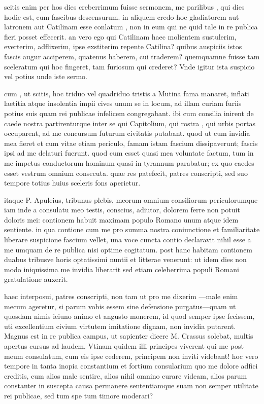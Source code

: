  scitis enim per hos dies creberrimum fuisse sermonem, me parilibus , qui dies hodie est, cum fascibus descensurum. in aliquem credo hoc gladiatorem aut latronem aut Catilinam esse conlatum , non in eum qui ne quid tale in re publica fieri posset effecerit. an vero ego qui Catilinam haec molientem sustulerim, everterim, adflixerim, ipse exstiterim repente Catilina? quibus auspiciis istos fascis augur acciperem, quatenus haberem, cui traderem? quemquamne fuisse tam sceleratum qui hoc fingeret, tam furiosum qui crederet? Vnde igitur ista suspicio vel potius unde iste sermo.

 cum , ut scitis, hoc triduo vel quadriduo tristis a Mutina fama manaret, inflati laetitia atque insolentia impii cives unum se in locum, ad illam curiam furiis potius suis quam rei publicae infelicem congregabant. ibi cum consilia inirent de caede nostra partirenturque inter se qui Capitolium, qui rostra , qui urbis portas occuparent, ad me concursum futurum civitatis putabant. quod ut cum invidia mea fieret et cum vitae etiam periculo, famam istam fascium dissipaverunt; fascis ipsi ad me delaturi fuerunt. quod cum esset quasi mea voluntate factum, tum in me impetus conductorum hominum quasi in tyrannum parabatur; ex quo caedes esset vestrum omnium consecuta. quae res patefecit, patres conscripti, sed suo tempore totius huius sceleris fons aperietur.

 itaque P. Apuleius, tribunus plebis, meorum omnium consiliorum periculorumque iam inde a consulatu meo testis, conscius, adiutor, dolorem ferre non potuit doloris mei: contionem habuit maximam populo Romano unum atque idem sentiente. in qua contione cum me pro summa nostra coniunctione et familiaritate liberare suspicione fascium vellet, una voce cuncta contio declaravit nihil esse a me umquam de re publica nisi optime cogitatum. post hanc habitam contionem duabus tribusve horis optatissimi nuntii et litterae venerunt: ut idem dies non modo iniquissima me invidia liberarit sed etiam celeberrima populi Romani gratulatione auxerit.

 haec interposui, patres conscripti, non tam ut pro me dixerim —male enim mecum ageretur, si parum vobis essem sine defensione purgatus—quam ut quosdam nimis ieiuno animo et angusto monerem, id quod semper ipse fecissem, uti excellentium civium virtutem imitatione dignam, non invidia putarent. Magnus est in re publica campus, ut sapienter dicere M. Crassus solebat, multis apertus cursus ad laudem. Vtinam quidem illi principes viverent qui me post meum consulatum, cum eis ipse cederem, principem non inviti videbant! hoc vero tempore in tanta inopia constantium et fortium consularium quo me dolore adfici creditis, cum alios male sentire, alios nihil omnino curare videam, alios parum constanter in suscepta causa permanere sententiamque suam non semper utilitate rei publicae, sed tum spe tum timore moderari?

